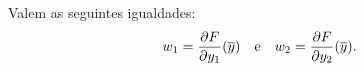 \begin{lema}
	Valem as seguintes igualdades:
	\begin{equation*}
	w_1 = \frac{\partial F}{\partial y_1}(\overline{y}) 
	\quad \text{e} \quad 
	w_2 = \frac{\partial F}{\partial y_2}(\overline{y}).
	\end{equation*}
\end{lema}
%	
